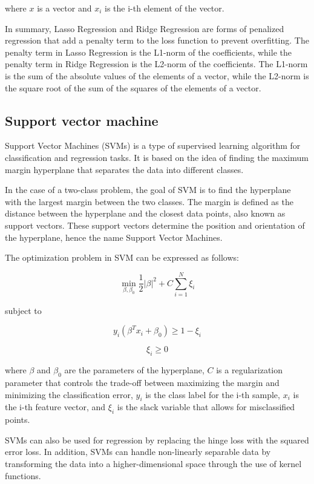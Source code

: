 \documentclass[12pt, a4paper, oneside]{article}
\begin{document}
where $x$ is a vector and $x_i$ is the i-th element of the vector.

In summary, Lasso Regression and Ridge Regression are forms of penalized regression that add a penalty term to the loss function to prevent overfitting. The penalty term in Lasso Regression is the L1-norm of the coefficients, while the penalty term in Ridge Regression is the L2-norm of the coefficients. The L1-norm is the sum of the absolute values of the elements of a vector, while the L2-norm is the square root of the sum of the squares of the elements of a vector.





\subsection{ Support vector machine }
Support Vector Machines (SVMs) is a type of supervised learning algorithm for classification and regression tasks. It is based on the idea of finding the maximum margin hyperplane that separates the data into different classes.

In the case of a two-class problem, the goal of SVM is to find the hyperplane with the largest margin between the two classes. The margin is defined as the distance between the hyperplane and the closest data points, also known as support vectors. These support vectors determine the position and orientation of the hyperplane, hence the name Support Vector Machines.

The optimization problem in SVM can be expressed as follows:

$$\min_{\beta, \beta_0} \frac{1}{2} \left| \beta \right|^2 + C \sum_{i=1}^{N} \xi_i$$

subject to

$$y_i (\beta^T x_i + \beta_0) \geq 1 - \xi_i$$

$$\xi_i \geq 0$$

where $\beta$ and $\beta_0$ are the parameters of the hyperplane, $C$ is a regularization parameter that controls the trade-off between maximizing the margin and minimizing the classification error, $y_i$ is the class label for the i-th sample, $x_i$ is the i-th feature vector, and $\xi_i$ is the slack variable that allows for misclassified points.

SVMs can also be used for regression by replacing the hinge loss with the squared error loss. In addition, SVMs can handle non-linearly separable data by transforming the data into a higher-dimensional space through the use of kernel functions.
\end{document}
